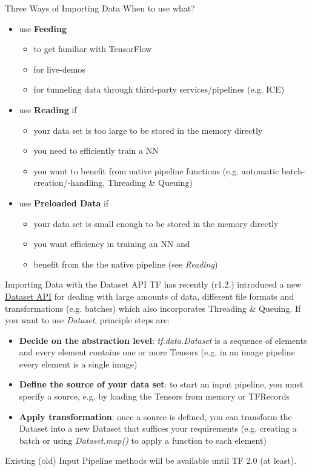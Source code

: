 \documentclass[18pt]{beamer}
\begin{document}
\begin{frame}{Three Ways of Importing Data}
When to use what?
\begin{itemize}
\item use \textbf{Feeding} 
\begin{itemize}
\item to get familiar with TensorFlow
\item for live-demos
\item for tunneling data through third-party services/pipelines (e.g. ICE)
\end{itemize}   
\pause
\item use \textbf{Reading}  if
\begin{itemize}
\item your data set is too large to be stored in the memory directly
\item you need to efficiently train a NN
\item you want to benefit from native pipeline functions (e.g. automatic batch-creation/-handling, Threading \& Queuing)
\end{itemize}
\pause
\item use \textbf{Preloaded Data} if 
\begin{itemize}
\item your data set is small enough to be stored in the memory directly
\item you want efficiency in training an NN and
\item benefit from the the native pipeline (see \emph{Reading})
\end{itemize}
\end{itemize}
\end{frame}


\begin{frame}{Importing Data with the Dataset API}
TF has recently (r1.2.) introduced a new \textcolor{kitgreen}{ \href{https://www.tensorflow.org/programmers_guide/datasets}{Dataset API}} for dealing with large amounts of data, different file formats and transformations (e.g. batches) which also incorporates Threading \& Queuing. If you want to use \emph{Dataset}, principle steps are:
\begin{itemize}
\item \textbf{Decide on the abstraction level}: \emph{tf.data.Dataset} is a sequence of elements and every element contains one or more Tensors (e.g. in an image pipeline every element is a single image)
\pause
\item \textbf{Define the source of your data set}: to start an input pipeline, you must specify a source, e.g. by loading the Tensors from memory or TFRecords
\pause
\item \textbf{Apply transformation}: once a source is defined, you can transform the Dataset into a new Dataset that suffices your requirements (e.g. creating a batch or using \emph{Dataset.map()} to apply a function to each element)
\end{itemize}
Existing (old) Input Pipeline methods will be available until TF 2.0 (at least).
\end{frame}
\end{document}
